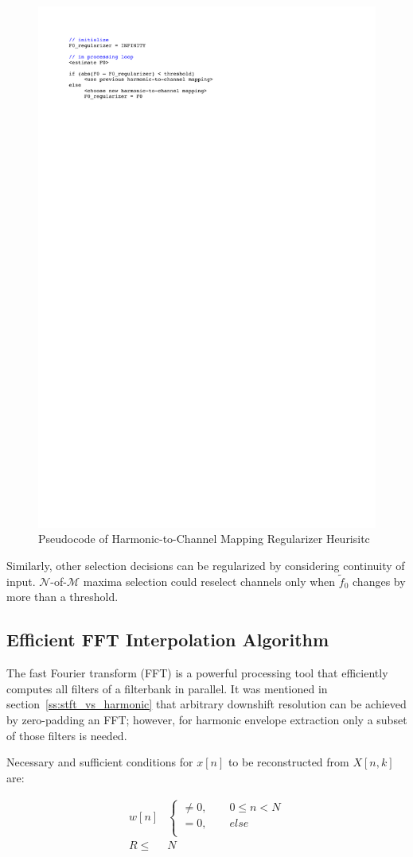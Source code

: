 \documentclass [11pt, proquest,oneside] {ganter_thesis}[2015/03/03]
\begin{document}
\begin{figure}[!ht]
  \centering
    \includegraphics[width=.6\textwidth]{pseudocode}
    \caption{Pseudocode of Harmonic-to-Channel Mapping Regularizer Heurisitc}\label{fig:heuristic_pseudocode}
\end{figure}

Similarly, other selection decisions can be regularized by considering continuity of input.  $\mathcal{N}$-of-$\mathcal{M}$ maxima selection could reselect channels only when $\tilde{f}_0$ changes by more than a threshold.

\subsection{Efficient FFT Interpolation Algorithm}

The fast Fourier transform (FFT) is a powerful processing tool that efficiently computes all filters of a filterbank in parallel.  It was mentioned in section~\ref{ss:stft_vs_harmonic} that arbitrary downshift resolution can be achieved by zero-padding an FFT; however, for harmonic envelope extraction only a subset of those filters is needed.

Necessary and sufficient conditions for $x[n]$ to be reconstructed from $X[n,k]$ \cite{portnoff1976implementation} are:

\begin{align}
w[n]& \left\{
                \begin{array}{ll}
                \neq 0, \qquad 0 \leq n < N \nonumber \\
			   = 0, \qquad else \\
                \end{array}
              \right. \\
%
              R \leq& N \nonumber
\end{align}
\end{document}
